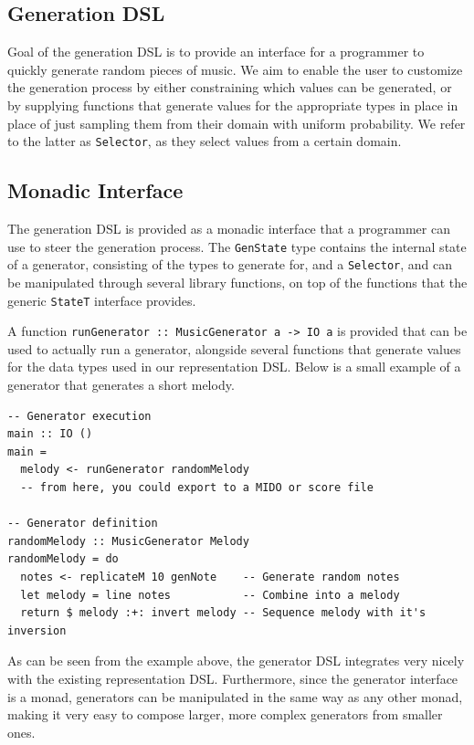 \documentclass[11pt,a4paper]{article}
\newcommand{\icode}[1]{\texttt{#1}}
\begin{document}
\subsection{Generation DSL}
Goal of the generation DSL is to provide an interface for a programmer to quickly generate random pieces of music. We aim to enable the user to customize the generation process by either constraining which values can be generated, or by supplying functions that generate values for the appropriate types in place in place of just sampling them from their domain with uniform probability. We refer to the latter as \icode{Selector}, as they select values from a certain domain.
\subsection{Monadic Interface}
The generation DSL is provided as a monadic interface that a programmer can use to steer the generation process. The \icode{GenState} type contains the internal state of a generator, consisting of the types to generate for, and a \icode{Selector}, and can be manipulated through several library functions, on top of the functions that the generic \icode{StateT} interface provides.

A function \icode{runGenerator :: MusicGenerator a -> IO a} is provided that can be used to actually run a generator, alongside several functions that generate values for the data types used in our representation DSL. Below is a small example of a generator that generates a short melody.

\begin{verbatim}
-- Generator execution
main :: IO ()
main =
  melody <- runGenerator randomMelody
  -- from here, you could export to a MIDO or score file

-- Generator definition
randomMelody :: MusicGenerator Melody
randomMelody = do
  notes <- replicateM 10 genNote    -- Generate random notes
  let melody = line notes           -- Combine into a melody
  return $ melody :+: invert melody -- Sequence melody with it's inversion
\end{verbatim}

As can be seen from the example above, the generator DSL integrates very nicely with the existing representation DSL. Furthermore, since the generator interface is a monad, generators can be manipulated in the same way as any other monad, making it very easy to compose larger, more complex generators from smaller ones.
\end{document}
